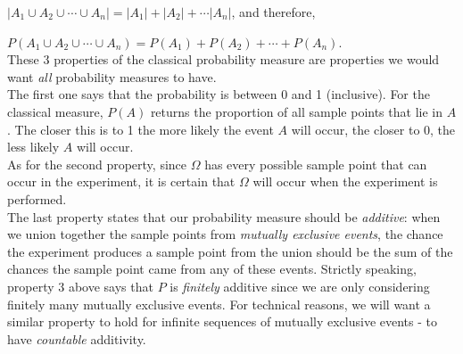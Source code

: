 \documentclass[12pt]{article}
\begin{document}
$|A_1\cup A_2\cup \cdots \cup A_n|= |A_1|+|A_2|+\cdots |A_n|$, and therefore,

$P(A_1\cup A_2\cup \cdots \cup A_n) = P(A_1)+P(A_2)+\cdots + P(A_n)$.\\

\noindent These 3 properties of the classical probability measure are properties we would want {\em all} probability measures to have.\\

\noindent The first one says that the probability is between 0 and 1 (inclusive). For the classical measure, $P(A)$ returns the proportion of all sample points that lie in $A$.
The closer this is to 1 the more likely the event $A$ will occur, the closer to 0, the less likely $A$ will occur. \\

\noindent As for the second property, since $\Omega$ has every possible sample point that can occur in the experiment, it is certain that $\Omega$ will occur when the experiment is performed.\\

\noindent The last property states that our probability measure should be {\em additive}:
when we union together the sample points from {\em mutually exclusive events}, the
chance the experiment produces a sample point from the union should be the sum of the
chances the sample point came from any of these events.  Strictly speaking, property 3
above says that $P$ is {\em finitely} additive since we are only considering finitely
many mutually exclusive events.  For technical reasons, we will want a similar property to hold for
infinite sequences of mutually exclusive events - to have {\em countable} additivity.\\




\newpage
\end{document}
